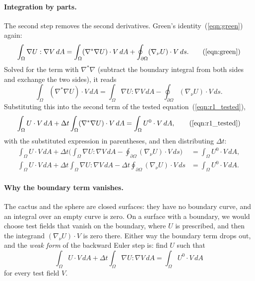\paragraph{Integration by parts.} The second step removes the second derivatives. Green's identity~(\ref{eqn:green}) again:
\begin{equation*}
\int_\Omega \nabla U : \nabla V\, dA = \int_\Omega (\nabla^* \nabla U) \cdot V\, dA + \oint_{\partial \Omega} (\nabla_\nu U) \cdot V\, ds. \tag{\ref{eqn:green}}
\end{equation*}
Solved for the term with $\nabla^*\nabla$ (subtract the boundary integral from both sides and exchange the two sides), it reads
\begin{equation*}
\int_\Omega (\nabla^*\nabla U)\cdot V\, dA = \int_\Omega \nabla U : \nabla V\, dA - \oint_{\partial\Omega} (\nabla_\nu U)\cdot V\, ds .
\end{equation*}
Substituting this into the second term of the tested equation~(\ref{eqn:r1_tested}),
\begin{equation*}
\int_\Omega U \cdot V\, dA + \Delta t \int_\Omega (\nabla^* \nabla U) \cdot V\, dA = \int_\Omega U^0 \cdot V\, dA , \tag{\ref{eqn:r1_tested}}
\end{equation*}
with the substituted expression in parentheses, and then distributing $\Delta t$:
\begin{align*}
\int_\Omega U \cdot V\, dA + \Delta t \Big( \int_\Omega \nabla U : \nabla V\, dA - \oint_{\partial\Omega} (\nabla_\nu U)\cdot V\, ds \Big) &= \int_\Omega U^0 \cdot V\, dA , \\
\int_\Omega U \cdot V\, dA + \Delta t \int_\Omega \nabla U : \nabla V\, dA - \Delta t \oint_{\partial\Omega} (\nabla_\nu U)\cdot V\, ds &= \int_\Omega U^0 \cdot V\, dA .
\end{align*}
\paragraph{Why the boundary term vanishes.} The cactus and the sphere are closed surfaces: they have no boundary curve, and an integral over an empty curve is zero. On a surface with a boundary, we would choose test fields that vanish on the boundary, where $U$ is prescribed, and then the integrand $(\nabla_\nu U)\cdot V$ is zero there. Either way the boundary term drops out, and the \emph{weak form} of the backward Euler step is: find $U$ such that
\begin{equation}
\label{eqn:weak}
\boxed{\;\int_\Omega U \cdot V\, dA + \Delta t \int_\Omega \nabla U : \nabla V\, dA = \int_\Omega U^0 \cdot V\, dA \;}
\end{equation}
for every test field $V$.

